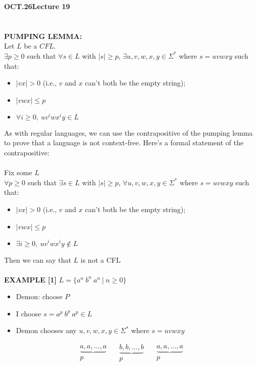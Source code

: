 \documentclass[11pt]{article}
\begin{document}
\newpage
\textbf{OCT.26\quad\quad Lecture 19}\\
\\
\\
\textbf{PUMPING LEMMA:}\\
Let $L$ be a $CFL$.\\
 $\exists p \geq 0$ such that $\forall s \in L$ with $|s|\geq p$, $\exists u,v,w,x,y \in \Sigma^*$ where $s=uvwxy$ such that:
 \begin{itemize}
 	\item $|vx|>0$  (i.e., $v$ and $x$ can't both be the empty string);
 	\item $|vwx| \leq p$
	\item $\forall i\geq 0,\ uv^iwx^iy \in L$
 \end{itemize}
 As with regular languages, we can use the contrapositive of the pumping lemma to prove that a language is not context-free. Here's a formal statement of the contrapositive:\\\\
 Fix some $L$\\
 $\forall p \geq 0$ such that $\exists s \in L$ with $|s|\geq p$, $\forall u,v,w,x,y \in \Sigma^*$ where $s=uvwxy$ such that:
  \begin{itemize}
 	\item $|vx|>0$  (i.e., $v$ and $x$ can't both be the empty string);
 	\item $|vwx| \leq p$
	\item $\exists i\geq 0,\ uv^iwx^iy \notin L$
 \end{itemize}
Then we can say that $L$ is not a CFL\\
\\
\textbf{EXAMPLE [1]} $L = \{ a^n\ b^n\ a^n\ |\ n\geq 0 \}$
\begin{itemize}
	\item Demon: choose $P$
	\item I choose $s = a^p\ b^p\ a^p \in L$
	\item Demon chooses any $ u,v,w,x,y \in \Sigma^*$ where $s=uvwxy$
\end{itemize}
$$ \begin{matrix} \underbrace{ a, a, \ldots, a } \\ p \end{matrix} \quad \begin{matrix} \underbrace{ b, b, \ldots, b } \\ p \end{matrix} \quad
\begin{matrix} \underbrace{ a, a, \ldots, a } \\ p \end{matrix} $$
\end{document}
